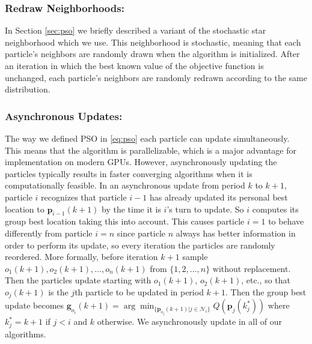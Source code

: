 \documentclass[cmbright]{staauth}
\numberwithin{table}{section}
\begin{document}
\subsubsection{Redraw Neighborhoods:}
In Section \ref{sec:pso} we briefly described a variant of the stochastic star neighborhood which we use. This neighborhood is stochastic, meaning that each particle's neighbors are randomly drawn when the algorithm is initialized. After an iteration in which the best known value of the objective function is unchanged, each particle's neighbors are randomly redrawn according to the same distribution.

\subsubsection{Asynchronous Updates:}
The way we defined PSO in \eqref{eq:pso} each particle can update simultaneously. This means that the algorithm is parallelizable, which is a major advantage for implementation on modern GPUs. However, asynchronously updating the particles typically results in faster converging algorithms when it is computationally feasible. In an asynchronous update from period $k$ to $k+1$, particle $i$ recognizes that particle $i-1$ has already updated its personal best location to $\bm{p}_{i-1}(k+1)$ by the time it is $i$'s turn to update. So $i$ computes its group best location taking this into account. This causes particle $i=1$ to behave differently from particle $i=n$ since particle $n$ always has better information in order to perform its update, so every iteration the particles are randomly reordered. More formally, before iteration $k+1$ sample $o_1(k+1), o_2(k+1), \dots, o_{n}(k+1)$ from $\{1,2,\dots,n\}$ without replacement. Then the particles update starting with $o_1(k+1)$, $o_2(k+1)$, etc., so that $o_j(k+1)$ is the $j$th particle to be updated in period $k+1$. Then the group best update becomes $\bm{g}_{o_i}(k+1) = \arg\min_{\{\bm{p}_{o_j}(k+1)|j\in\mathcal{N}_i\}}Q(\bm{p}_j(k_j^*))$ where $k^*_j=k+1$ if $j<i$ and $k$ otherwise. We asynchronously update in all of our algorithms.
\end{document}
